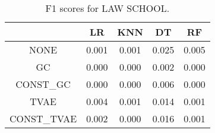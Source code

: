 \begin{table}
\caption{F1 scores for LAW SCHOOL.}
\label{tab:f1-LAW SCHOOL}
\begin{tabular}{ccccc}
\toprule
 & LR & KNN & DT & RF \\
\midrule
NONE & 0.001 & 0.001 & 0.025 & 0.005 \\
GC & 0.000 & 0.000 & 0.002 & 0.000 \\
CONST\_GC & 0.000 & 0.000 & 0.006 & 0.000 \\
TVAE & 0.004 & 0.001 & 0.014 & 0.001 \\
CONST\_TVAE & 0.002 & 0.000 & 0.016 & 0.001 \\
\bottomrule
\end{tabular}
\end{table}
